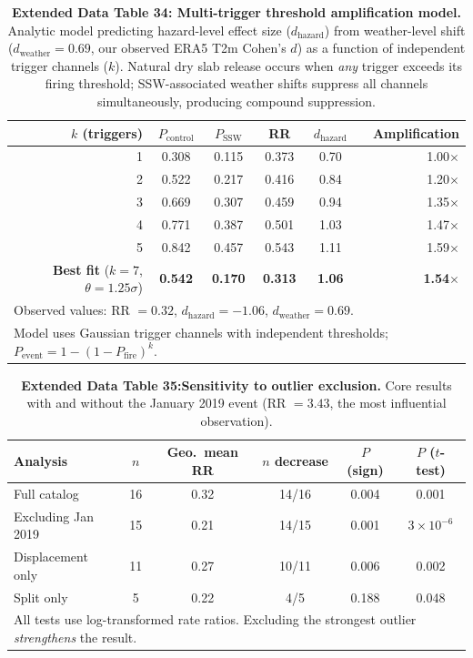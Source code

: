 \documentclass[11pt,letterpaper]{article}
\begin{document}
\begin{table}[h!]
\centering
\caption{\textbf{Extended Data Table 34: Multi-trigger threshold amplification model.} Analytic model predicting hazard-level effect size ($d_{\mathrm{hazard}}$) from weather-level shift ($d_{\mathrm{weather}} = 0.69$, our observed ERA5 T2m Cohen's $d$) as a function of independent trigger channels ($k$). Natural dry slab release occurs when \emph{any} trigger exceeds its firing threshold; SSW-associated weather shifts suppress all channels simultaneously, producing compound suppression.}
\label{tab:threshold_amp}
\begin{tabular}{rccccr}
\toprule
$k$ (triggers) & $P_{\mathrm{control}}$ & $P_{\mathrm{SSW}}$ & RR & $d_{\mathrm{hazard}}$ & Amplification \\
\midrule
1 & 0.308 & 0.115 & 0.373 & 0.70 & 1.00$\times$ \\
2 & 0.522 & 0.217 & 0.416 & 0.84 & 1.20$\times$ \\
3 & 0.669 & 0.307 & 0.459 & 0.94 & 1.35$\times$ \\
4 & 0.771 & 0.387 & 0.501 & 1.03 & 1.47$\times$ \\
5 & 0.842 & 0.457 & 0.543 & 1.11 & 1.59$\times$ \\
\midrule
\textbf{Best fit} ($k = 7$, $\theta = 1.25\sigma$) & \textbf{0.542} & \textbf{0.170} & \textbf{0.313} & \textbf{1.06} & \textbf{1.54$\times$} \\
\bottomrule
\multicolumn{6}{l}{\footnotesize Observed values: RR $= 0.32$, $d_{\mathrm{hazard}} = -1.06$, $d_{\mathrm{weather}} = 0.69$.} \\
\multicolumn{6}{l}{\footnotesize Model uses Gaussian trigger channels with independent thresholds; $P_{\mathrm{event}} = 1 - (1 - P_{\mathrm{fire}})^k$.} \\
\end{tabular}
\end{table}

\begin{table}[h!]
\centering
\caption{\textbf{Extended Data Table 35:Sensitivity to outlier exclusion.} Core results with and without the January 2019 event (RR $= 3.43$, the most influential observation).}
\label{tab:outlier_sens}
\begin{tabular}{lccccc}
\toprule
Analysis & $n$ & Geo.\ mean RR & $n$ decrease & $P$ (sign) & $P$ ($t$-test) \\
\midrule
Full catalog & 16 & 0.32 & 14/16 & 0.004 & 0.001 \\
Excluding Jan 2019 & 15 & 0.21 & 14/15 & 0.001 & $3 \times 10^{-6}$ \\
Displacement only & 11 & 0.27 & 10/11 & 0.006 & 0.002 \\
Split only & 5 & 0.22 & 4/5 & 0.188 & 0.048 \\
\bottomrule
\multicolumn{6}{l}{\footnotesize All tests use log-transformed rate ratios. Excluding the strongest outlier \emph{strengthens} the result.} \\
\end{tabular}
\end{table}
\end{document}
